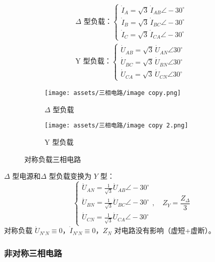 \documentclass[a4paper]{article}  %
\theoremstyle{MyLineTheoremStyle} %
\theoremstyle{MyBlockTheoremStyle} %
\theoremstyle{MySubsubsectionStyle} %
\begin{document}
\begin{multicols*}{4}
\begin{gather}
    \text{$\Delta$ 型负载：}
    \begin{cases}
        \dot{I}_A = \sqrt{3} \, \dot{I}_{AB} \angle -30^\circ \\
        \dot{I}_B = \sqrt{3} \, \dot{I}_{BC} \angle -30^\circ \\
        \dot{I}_C = \sqrt{3} \, \dot{I}_{CA} \angle -30^\circ
    \end{cases}
    \\
    \text{Y 型负载：}
    \begin{cases}
        \dot{U}_{AB} = \sqrt{3} \, \dot{U}_{AN} \angle 30^\circ \\
        \dot{U}_{BC} = \sqrt{3} \, \dot{U}_{BN} \angle 30^\circ \\
        \dot{U}_{CA} = \sqrt{3} \, \dot{U}_{CN} \angle 30^\circ
    \end{cases}
\end{gather}

\begin{figure}[H]\centering
\begin{subfigure}[b]{0.5\columnwidth}\centering
    \texttt{[image: assets/三相电路/image copy.png]}
    \caption{$\Delta$ 型负载}
\end{subfigure}\hfill
\begin{subfigure}[b]{0.5\columnwidth}\centering
    \texttt{[image: assets/三相电路/image copy 2.png]}
    \caption{Y 型负载}
\end{subfigure}
\caption{对称负载三相电路}
\end{figure}

$\Delta$ 型电源和$\Delta$ 型负载变换为 $Y$ 型：
\begin{equation}
\begin{cases}
\dot{U}_{AN} = \frac{1}{\sqrt{3}} \dot{U}_{AB} \angle -30^\circ \\
\dot{U}_{BN} = \frac{1}{\sqrt{3}} \dot{U}_{BC} \angle -30^\circ \\
\dot{U}_{CN} = \frac{1}{\sqrt{3}} \dot{U}_{CA} \angle -30^\circ
\end{cases},\quad 
Z_{Y} = \frac{Z_{\Delta}}{3}
\end{equation}
对称负载 $\dot{U}_{N'N} \equiv 0$，$\dot{I}_{N'N} \equiv 0$，$Z_N$ 对电路没有影响（虚短+虚断）。

\subsubsection{非对称三相电路}


\end{multicols*}
\end{document}
